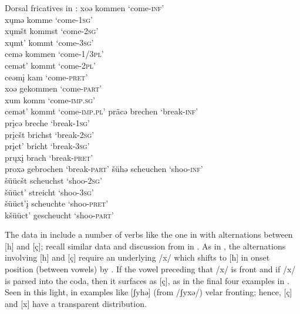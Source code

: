 {\ea%
\label{ex:15:36}Dorsal fricatives in :
\ea\label{ex:15:36a} xoə \tab [xoə] \tab kommen \tab ‘come-\textsc{inf}’\\
    x\k{u}mə \tab [xʊmə] \tab komme \tab ‘come-\textsc{1}\textsc{sg}’\\
    x\k{u}mšt \tab [xʊmʃt] \tab kommst \tab ‘come-\textsc{2}\textsc{sg}’\\
    x\k{u}mt' \tab [xʊmt] \tab kommt \tab ‘come-\textsc{3}\textsc{sg}’\\
    cemə \tab [çemə] \tab kommen \tab ‘come-\textsc{1/3}\textsc{pl}’\\
    cemət' \tab [çemət] \tab kommt \tab ‘come-\textsc{2}\textsc{pl}’\\
    ceəmį \tab [çeəmɪ] \tab kam \tab ‘come-\textsc{pret}’\\
    xoə  \tab  [xoə] \tab gekommen \tab ‘come-\textsc{part}’\\
    xum \tab [xum] \tab komm \tab ‘come-\textsc{imp}.\textsc{sg}’\\
    cemət' \tab [çemət] \tab kommt \tab ‘come-\textsc{imp}.\textsc{pl}’
\ex\label{ex:15:36b} präcə \tab [præçə] \tab brechen \tab ‘break-\textsc{inf}’\\
    prįcə \tab [prɪçə] \tab breche \tab ‘break-\textsc{1}\textsc{sg}’\\
    prįcšt \tab [prɪçʃt] \tab brichst \tab ‘break-\textsc{2}\textsc{sg}’\\
    prįct' \tab [prɪçt] \tab bricht \tab ‘break-\textsc{3}\textsc{sg}’\\
    pr\k{u}xį \tab [prʊxɪ] \tab brach \tab ‘break-\textsc{pret}’\\
    proxə \tab [proxə] \tab gebrochen \tab ‘break-\textsc{part}’
\ex\label{ex:15:36c} šühə \tab [ʃyhə] \tab scheuchen \tab ‘shoo-\textsc{inf}’\\
    šüücšt \tab [ʃyːçʃt] \tab scheuchst \tab ‘shoo-\textsc{2}\textsc{sg}’\\
    šüüct' \tab [ʃyːçt] \tab streicht \tab ‘shoo-\textsc{3}\textsc{sg}’\\
    šüüct'į \tab [ʃyːçtɪ] \tab scheuchte \tab ‘shoo-\textsc{pret}’\\
    kšüüct' \tab [kʃyːçt] \tab gescheucht \tab ‘shoo-\textsc{part}’
\z 
\z 

The data in \citet{Zahler1901} include a number of verbs like the one in  with alternations between [h] and [ç]; recall similar data and discussion from  \citep{Meinherz1920} in . As in , the alternations involving [h] and [ç] require an underlying /x/ which shifts to [h] in onset position (between vowels) by . If the vowel preceding that /x/ is front and if /x/ is parsed into the coda, then it surfaces as [ç], as in the final four examples in . Seen in this light,  in examples like [ʃyhə] (from /ʃyxə/)  velar fronting; hence, [ç] and [x] have a transparent distribution.

}
